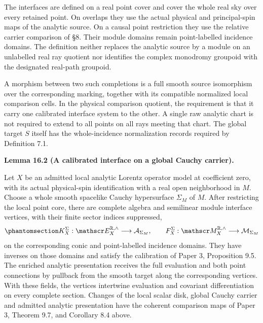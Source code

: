 \documentclass[
  english,
  11pt,
  reqno]{amsart}
\makeatletter
\newcommand{\pandocstatementheading}[1]{%
  \par\if@nobreak\else
    \addpenalty{\@beginparpenalty}%
    \addvspace{.5\baselineskip plus .2\baselineskip minus .2\baselineskip}%
  \fi
  {\normalfont\bfseries #1\par}%
  \nobreak\@afterindenttrue\@afterheading
}
\makeatother
\begin{document}
The interfaces are defined on a real point cover and cover the whole
real sky over every retained point. On overlaps they use the actual
physical and principal-spin maps of the analytic source. On a causal
point restriction they use the relative carrier comparison of §8. Their
module domains remain point-labelled incidence domains. The definition
neither replaces the analytic source by a module on an unlabelled real
ray quotient nor identifies the complex monodromy groupoid with the
designated real-path groupoid.

A morphism between two such completions is a full smooth source
isomorphism over the corresponding marking, together with its compatible
normalized local comparison cells. In the physical comparison quotient,
the requirement is that it carry one calibrated interface system to the
other. A single raw analytic chart is not required to extend to all
points on all rays meeting that chart. The global target \(S\) itself
has the whole-incidence normalization records required by Definition
7.1.

\pandocstatementheading{\protect{}\label{lem:analytic-local-global-carrier-interface}Lemma 16.2 (A calibrated interface on a global Cauchy carrier).}

Let \(X\) be an admitted local analytic Lorentz operator model at
coefficient zero, with its actual physical-spin identification with a
real open neighborhood in \(M\). Choose a whole smooth spacelike Cauchy
hypersurface \(\Sigma_M\) of \(M\). After restricting the local point
core, there are complete algebra and semilinear module interface
vertices, with their finite sector indices suppressed,
\begin{equation}\protect\phantomsection\label{eq:analytic-local-global-interface-vertices}{
K_X^\Sigma:\mathscr E_X^{\mathbb R,\wedge}
 \longrightarrow\mathcal A_{\Sigma_M},
\qquad
F_X^\Sigma:\mathscr M_X^{\mathbb R,\wedge}
 \longrightarrow\mathcal M_{\Sigma_M}
}\end{equation} on the corresponding conic and point-labelled incidence
domains. They have inverses on those domains and satisfy the calibration
of Paper 3, Proposition 9.5. The enriched analytic presentation receives
the full evaluation and both point connections by pullback from the
smooth target along the corresponding vertices. With these fields, the
vertices intertwine evaluation and covariant differentiation on every
complete section. Changes of the local scalar disk, global Cauchy
carrier and admitted analytic presentation have the coherent comparison
maps of Paper 3, Theorem 9.7, and Corollary 8.4 above.
\end{document}
